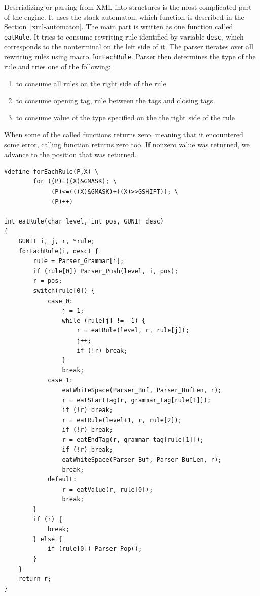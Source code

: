 \documentclass[12pt,notitlepage]{report}
\begin{document}
Deserializing or parsing from XML into structures is the most complicated part of the engine. It uses the stack automaton, which function is described in the Section~\ref{xml-automaton}. The main part is written as one function called \texttt{eatRule}. It tries to consume rewriting rule identified by variable \texttt{desc}, which corresponds to the nonterminal on the left side of it. The parser iterates over all rewriting rules using macro \texttt{forEachRule}. Parser then determines the type of the rule and tries one of the following:
\begin{enumerate}
 \item to consume all rules on the right side of the rule
 \item to consume opening tag, rule between the tags and closing tags
 \item to consume value of the type specified on the the right side of the rule
\end{enumerate}
When some of the called functions returns zero, meaning that it encountered some error, calling function returns zero too. If nonzero value was returned, we advance to the position that was returned.

\begin{small}
\begin{lstlisting}
#define forEachRule(P,X) \
        for ((P)=((X)&GMASK); \
             (P)<=(((X)&GMASK)+((X)>>GSHIFT)); \
             (P)++)

int eatRule(char level, int pos, GUNIT desc)
{
    GUNIT i, j, r, *rule;
    forEachRule(i, desc) {
        rule = Parser_Grammar[i];
        if (rule[0]) Parser_Push(level, i, pos);
        r = pos;
        switch(rule[0]) {
            case 0:
                j = 1;
                while (rule[j] != -1) {
                    r = eatRule(level, r, rule[j]);
                    j++;
                    if (!r) break;
                }
                break;
            case 1:
                eatWhiteSpace(Parser_Buf, Parser_BufLen, r);
                r = eatStartTag(r, grammar_tag[rule[1]]);
                if (!r) break;
                r = eatRule(level+1, r, rule[2]);
                if (!r) break;
                r = eatEndTag(r, grammar_tag[rule[1]]);
                if (!r) break;
                eatWhiteSpace(Parser_Buf, Parser_BufLen, r);
                break;
            default:
                r = eatValue(r, rule[0]);
                break;
        }
        if (r) {
            break;
        } else {
            if (rule[0]) Parser_Pop();
        } 
    }
    return r;
}
\end{lstlisting}
\end{small}
\end{document}
